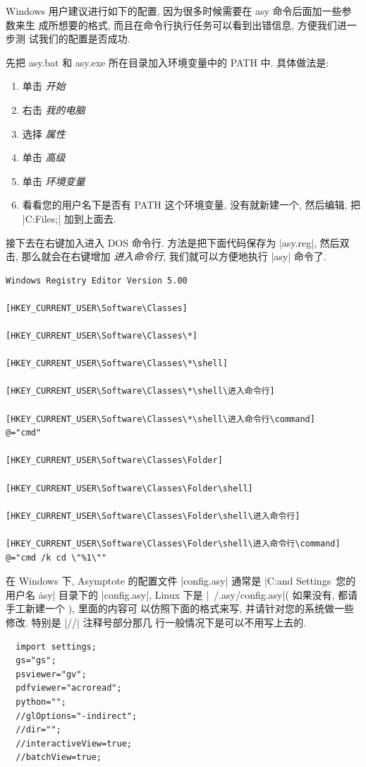 \documentclass{ctexbook}
\begin{document}
Windows 用户建议进行如下的配置, 因为很多时候需要在 asy 命令后面加一些参数来生
成所想要的格式, 而且在命令行执行任务可以看到出错信息, 方便我们进一步测
试我们的配置是否成功.

先把 asy.bat 和 asy.exe 所在目录加入环境变量中的 PATH 中. 具体做法是:
\begin{enumerate}
\item  单击 \emph{开始}
\item 右击 \emph{我的电脑}
\item 选择 \emph{属性}
\item 单击 \emph{高级}
\item 单击 \emph{环境变量}
\item 看看您的用户名下是否有 PATH 这个环境变量, 没有就新建一个, 然后编辑, 把
  |C:\Program Files\Asymptote;| 加到上面去.
\end{enumerate}

接下去在右键加入进入 DOS 命令行.
\label{Windows:DOS}
方法是把下面代码保存为 |asy.reg|, 然后双击, 那么就会在右键增加
\emph{进入命令行}, 我们就可以方便地执行 |asy| 命令了.
\begin{verbatim}
Windows Registry Editor Version 5.00

[HKEY_CURRENT_USER\Software\Classes]

[HKEY_CURRENT_USER\Software\Classes\*]

[HKEY_CURRENT_USER\Software\Classes\*\shell]

[HKEY_CURRENT_USER\Software\Classes\*\shell\进入命令行]

[HKEY_CURRENT_USER\Software\Classes\*\shell\进入命令行\command]
@="cmd"

[HKEY_CURRENT_USER\Software\Classes\Folder]

[HKEY_CURRENT_USER\Software\Classes\Folder\shell]

[HKEY_CURRENT_USER\Software\Classes\Folder\shell\进入命令行]

[HKEY_CURRENT_USER\Software\Classes\Folder\shell\进入命令行\command]
@="cmd /k cd \"%1\""
\end{verbatim}

在 Windows 下, Asymptote 的配置文件 |config.asy| 通常是
|C:\Documents and Settings\ 您的用户名 \.asy| 目录下的 |config.asy|,
Linux 下是 |~/.asy/config.asy|( 如果没有, 都请手工新建一个 ), 里面的内容可
以仿照下面的格式来写, 并请针对您的系统做一些修改. 特别是 |//| 注释号部分那几
行一般情况下是可以不用写上去的.
\begin{lstlisting}
  import settings;
  gs="gs";
  psviewer="gv";
  pdfviewer="acroread";
  python="";
  //glOptions="-indirect";
  //dir="";
  //interactiveView=true;
  //batchView=true;
\end{lstlisting}
\end{document}
